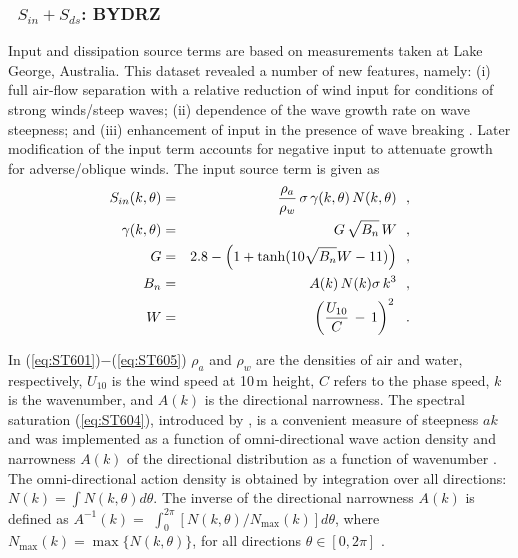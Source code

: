 \vsssub
\subsubsection{~$S_{in} + S_{ds}$: BYDRZ} \label{sec:ST6}
\vsssub


\noindent
Input and dissipation source terms are based on measurements taken at Lake
George, Australia. This dataset revealed a number of new features, namely: (i)
full air-flow separation with a relative reduction of wind input for
conditions of strong winds/steep waves; (ii) dependence of the wave growth
rate on wave steepness; and (iii) enhancement of input in the presence of wave
breaking \citep{art:Dea06,art:Bea07}. Later modification of the input term
accounts for negative input to attenuate growth for adverse/oblique winds.
The input source term is given as
\begin{eqnarray}
S_{in}(k,\theta) & = & \frac{\rho_a}{\rho_w}\, \sigma\,\gamma(k,\theta)\,N(k,\theta) \:\:\: ,
\label{eq:ST601} \\ \gamma(k,\theta) &=& G\,\sqrt{B_n}\,W \:\:\: ,
\label{eq:ST602} \\
G                &=& 2.8-\Bigl (1+\tanh (10\sqrt{B_n}W-11) \Bigr) \:\:\: ,
\label{eq:ST603} \\
B_n              &=& A(k)\,N(k)\sigma\,k^3 \:\:\: ,
\label{eq:ST604} \\
W                &=& \left (\frac{U_{10}}{C}\,-\,1 \right )^2 \:\:\: .
\label{eq:ST605}
\end{eqnarray}

\noindent
In (\ref{eq:ST601})$-$(\ref{eq:ST605}) $\rho_a$ and $\rho_w$ are the densities
of air and water, respectively, $U_{10}$ is the wind speed at 10\,m height,
$C$ refers to the phase speed, $k$ is the wavenumber, and $A(k)$ is the
directional narrowness. The spectral saturation (\ref{eq:ST604}), introduced
by \citet{art:Phi84}, is a convenient measure of steepness $ak$ and was
implemented as a function of omni-directional wave action density and
narrowness $A(k)$ of the directional distribution as a function of wavenumber
\citep{art:BGM02}.  The omni-directional action density is obtained by
integration over all directions: $N(k)=\int N(k,\theta)d\theta$.  \linebreak
The inverse of the directional narrowness $A(k)$ is defined as \linebreak
$A^{-1}(k) =$ $\int_{0}^{2\pi} [{N(k,\theta)}/{N_{\max}(k)}] d\theta$, where
$N_{\max}(k)=\max\bigl \{N(k,\theta)\bigr \}$, for all directions
$\theta\in[0,2\pi]$ \citep{art:BS87}.


